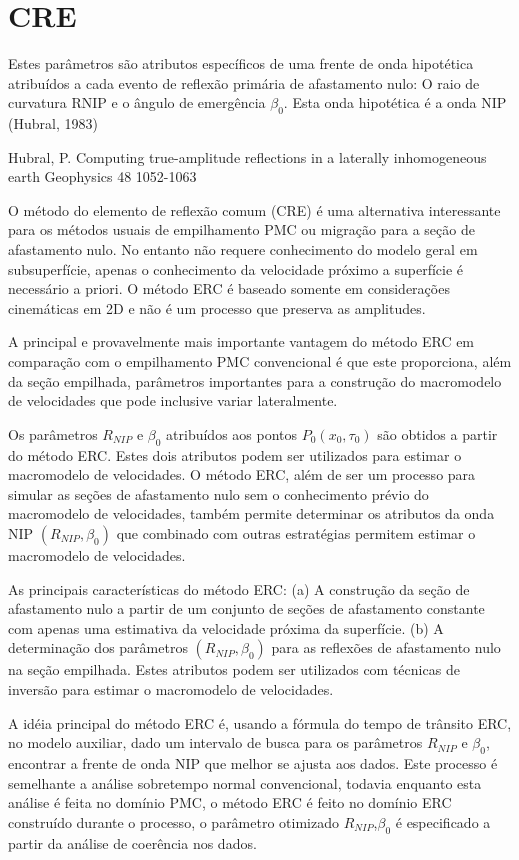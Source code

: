 \chapter{CRE}
\label{cap4}

Estes parâmetros são atributos específicos de uma frente de onda hipotética atribuídos a cada evento de reflexão
primária de afastamento nulo: O raio de curvatura RNIP e o ângulo de emergência $\beta_0$. Esta onda hipotética é
a onda NIP (Hubral, 1983)

Hubral, P.
Computing true-amplitude reflections in a laterally inhomogeneous earth
Geophysics 48 1052-1063



O método do elemento de reflexão comum (CRE) é uma alternativa interessante para os métodos usuais de empilhamento PMC ou
migração para a seção de afastamento nulo. No entanto não requere conhecimento do modelo geral em subsuperfície, apenas
o conhecimento da velocidade próximo a superfície é necessário a priori.
O método ERC é baseado somente em considerações cinemáticas em 2D e não é
um processo que preserva as amplitudes.

A principal e provavelmente mais importante vantagem do método ERC em comparação com o empilhamento PMC convencional
é que este proporciona, além da seção empilhada, parâmetros importantes para a construção do macromodelo de 
velocidades que pode inclusive variar lateralmente.

Os parâmetros $R_{NIP}$ e $\beta_0$ atribuídos aos pontos $P_0(x_0,\tau_0)$ são obtidos a partir do método ERC.
Estes dois atributos podem ser utilizados para estimar o macromodelo de velocidades.
O método ERC, além de ser um processo para simular as seções de afastamento nulo sem o conhecimento prévio
do macromodelo de velocidades, também permite determinar os atributos da onda NIP $(R_{NIP},\beta_0)$
que combinado com outras estratégias permitem estimar o macromodelo de velocidades.

As principais características do método ERC:
(a) A construção da seção de afastamento nulo a partir de um conjunto de seções de afastamento constante
com apenas uma estimativa da velocidade próxima da superfície.
(b) A determinação dos parâmetros $(R_{NIP},\beta_0)$ para as reflexões de afastamento nulo na seção empilhada.
Estes atributos podem ser utilizados com técnicas de inversão para estimar o macromodelo de velocidades.

A idéia principal do método ERC é, usando a fórmula do tempo de trânsito ERC, no modelo auxiliar, dado um intervalo
de busca para os parâmetros $R_{NIP}$ e $\beta_0$, encontrar a frente de onda NIP que melhor se ajusta aos dados.
Este processo é semelhante a análise sobretempo normal convencional, todavia enquanto esta análise é feita no
domínio PMC, o método ERC é feito no domínio ERC construído durante o processo, o parâmetro otimizado $R_{NIP}$,$\beta_0$
é especificado a partir da análise de coerência nos dados.


